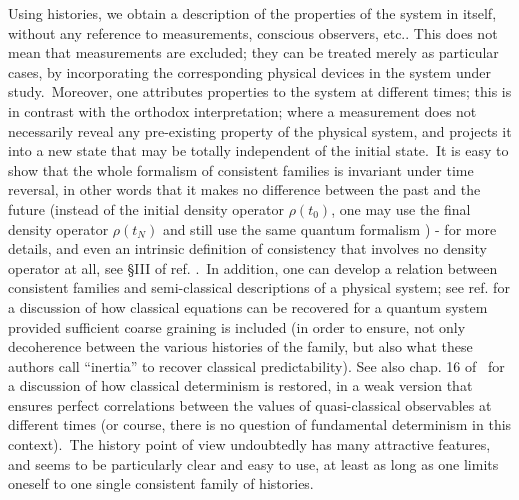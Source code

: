\documentclass[12pt,onecolumn]{article}%
\begin{document}
Using histories, we obtain a description of the properties of the system in
itself, without any reference to measurements, conscious observers, etc.. This
does not mean that measurements are excluded; they can be treated merely as
particular cases, by incorporating the corresponding physical devices in the
system under study.\ Moreover, one attributes properties to the system at
different times; this is in contrast with the orthodox interpretation; where a
measurement does not necessarily reveal any pre-existing property of the
physical system, and projects it into a new state that may be totally
independent of the initial state.\ It is easy to show that the whole formalism
of consistent families is invariant under time reversal, in other words that
it makes no difference between the past and the future (instead of the initial
density operator $\rho(t_{0})$, one may use the final density operator
$\rho(t_{N})$ and still use the same quantum formalism \cite{ABL}) - for more
details, and even an intrinsic definition of consistency that involves no
density operator at all, see \S III of ref. \cite{Griffiths-2}.\ In addition,
one can develop a relation between consistent families and semi-classical
descriptions of a physical system; see ref. \cite{Gell-Mann} for a discussion
of how classical equations can be recovered for a quantum system provided
sufficient coarse graining is included (in order to ensure, not only
decoherence between the various histories of the family, but also what these
authors call ``inertia'' to recover classical predictability). See also chap.
16 of \cite{Omnes-3}\ for a discussion of how classical determinism is
restored, in a weak version that ensures perfect correlations between the
values of quasi-classical observables at different times (or course, there is
no question of fundamental determinism in this context).\ The history point of
view undoubtedly has many attractive features, and seems to be particularly
clear and easy to use, at least as long as one limits oneself to one single
consistent family of histories.
\end{document}

